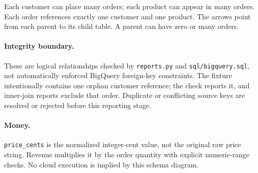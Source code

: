 \documentclass{article}
\begin{document}
Each customer can place many orders; each product can appear in many orders.
Each order references exactly one customer and one product. The arrows point
from each parent to its child table. A parent can have zero or many orders.

\paragraph{Integrity boundary.} These are logical relationships checked by
\texttt{reports.py} and \texttt{sql/bigquery.sql}, not automatically enforced
BigQuery foreign-key constraints. The fixture intentionally contains one
orphan customer reference; the check reports it, and inner-join reports
exclude that order. Duplicate or conflicting source keys are resolved or
rejected before this reporting stage.

\paragraph{Money.} \texttt{price\_cents} is the normalized integer-cent value,
not the original raw price string. Revenue multiplies it by the order
quantity with explicit numeric-range checks. No cloud execution is implied
by this schema diagram.
\end{document}
